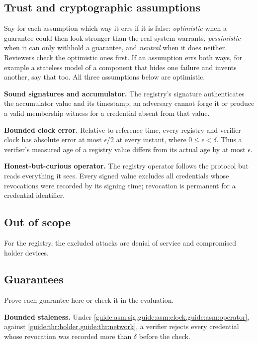 \subsection[Trust and cryptographic assumptions]{Trust and cryptographic assumptions\skimmark}\label{guide:chapters:assumptions}
Say for each assumption which way it errs if it is false: \emph{optimistic} when a guarantee could then look stronger than the real system warrants, \emph{pessimistic} when it can only withhold a guarantee, and \emph{neutral} when it does neither. Reviewers check the optimistic ones first. If an assumption errs both ways, for example a stateless model of a component that hides one failure and invents another, say that too. All three assumptions below are optimistic.
\begin{assumptions}
  \item\label{guide:asm:sig} \textbf{Sound signatures and accumulator.} The registry's signature authenticates the accumulator value and its timestamp; an adversary cannot forge it or produce a valid membership witness for a credential absent from that value.
  \item\label{guide:asm:clock} \textbf{Bounded clock error.} Relative to reference time, every registry and verifier clock has absolute error at most $\epsilon/2$ at every instant, where $0\leq\epsilon<\delta$. Thus a verifier's measured age of a registry value differs from its actual age by at most $\epsilon$.
  \item\label{guide:asm:operator} \textbf{Honest-but-curious operator.} The registry operator follows the protocol but reads everything it sees. Every signed value excludes all credentials whose revocations were recorded by its signing time; revocation is permanent for a credential identifier.
\end{assumptions}

\subsection{Out of scope}\label{guide:chapters:out-of-scope}
For the registry, the excluded attacks are denial of service and compromised holder devices.

\subsection[Guarantees]{Guarantees\skimmark}\label{guide:chapters:guarantees}
Prove each guarantee here or check it in the evaluation.
\begin{guarantees}
  \item\label{guide:g:stale} \textbf{Bounded staleness.} Under \cref{guide:asm:sig,guide:asm:clock,guide:asm:operator}, against \cref{guide:thr:holder,guide:thr:network}, a verifier rejects every credential whose revocation was recorded more than $\delta$ before the check.
\end{guarantees}

